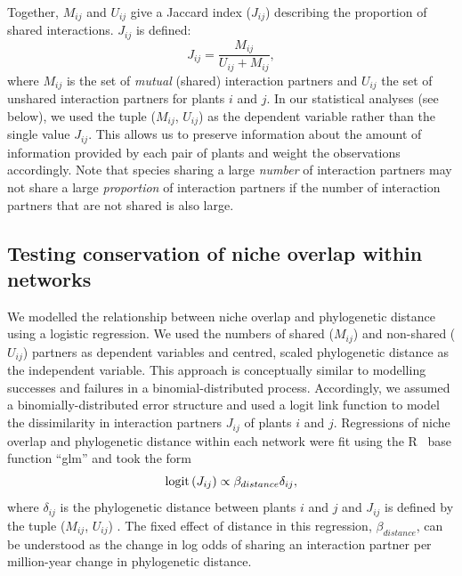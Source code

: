 \documentclass[12pt]{article}
\begin{document}
\begin{spacing}{1.5}
    Together, $M_{ij}$ and $U_{ij}$ give a Jaccard index ($J_{ij}$) describing 
    the proportion of shared interactions. $J_{ij}$ is defined: 
    \begin{equation}
      J_{ij} = \frac{M_{ij}}{U_{ij}+M_{ij}} ,
    \end{equation}
    where $M_{ij}$ is the set of \emph{mutual} (shared) interaction partners and $U_{ij}$ the set of unshared interaction partners for plants $i$ and $j$.
    In our statistical analyses (see below), we used the tuple ($M_{ij}$, $U_{ij}$) as the
    dependent variable rather than the single value $J_{ij}$. 
    This allows us to preserve information about the amount of information provided by each pair of plants and weight the observations accordingly.
    Note that species sharing a large \emph{number} of interaction partners may not share a large \emph{proportion} of interaction partners if the number of interaction partners that are not shared is also large. %


  \subsection*{Testing conservation of niche overlap within networks} 

    We modelled the relationship between niche overlap and phylogenetic 
    distance using a logistic regression. We used the numbers of shared 
    ($M_{ij}$) and non-shared ($U_{ij}$) partners as dependent variables and 
    centred, scaled phylogenetic distance as the independent variable. This 
    approach is conceptually similar to modelling successes and failures in a 
    binomial-distributed process. Accordingly, we assumed a binomially-distributed error structure and used a logit link function to model the dissimilarity in interaction partners 
    $J_{ij}$ of plants $i$ and $j$. Regressions of niche overlap and 
    phylogenetic distance within 
    each network were fit using the R~\citep{R} base function ``glm'' and 
    took the form
      \begin{equation}
        {\rm logit}\left(J_{ij}\right) \propto \beta_{distance}\delta_{ij} ,
        \label{basic}
      \end{equation}
    where $\delta_{ij}$ is the phylogenetic distance between plants $i$ and 
    $j$ and $J_{ij}$ is defined by the tuple ($M_{ij}$, $U_{ij}$) . 
    The fixed effect of distance in this regression, $\beta_{distance}$, 
    can be understood as the change in log odds of sharing an interaction 
    partner per million-year change in phylogenetic distance. 



\end{spacing}
\end{document}
